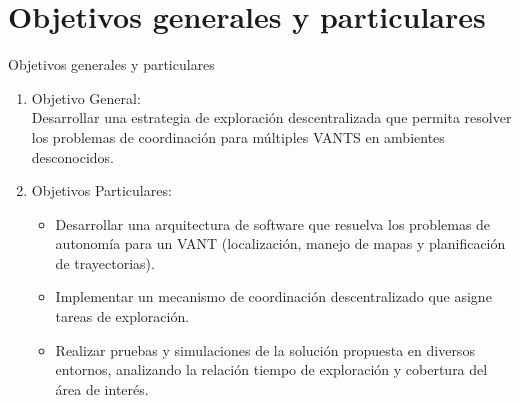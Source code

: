 \documentclass[
  24pt, %
  aspectratio=169, %
]{beamer}
\begin{document}
\section{Objetivos generales y particulares}
\begin{frame}{Objetivos generales y particulares}
  \begin{enumerate}
  \item Objetivo General:\\
    \bigskip
    Desarrollar una estrategia de exploración descentralizada que permita resolver los problemas de coordinación para múltiples VANTS en ambientes desconocidos.
    \pause
    \bigskip
  \item Objetivos Particulares:\\
    \vspace{4mm}
    \begin{itemize}
    \item Desarrollar una arquitectura de software que resuelva los problemas de autonomía para un VANT (localización, manejo de mapas y planificación de trayectorias).
    \item Implementar un mecanismo de coordinación descentralizado que asigne tareas de exploración.
    \item Realizar pruebas y simulaciones de la solución propuesta en diversos entornos, analizando la relación tiempo de exploración y cobertura del área de interés.
    \end{itemize}
  \end{enumerate}
\end{frame}
\end{document}
